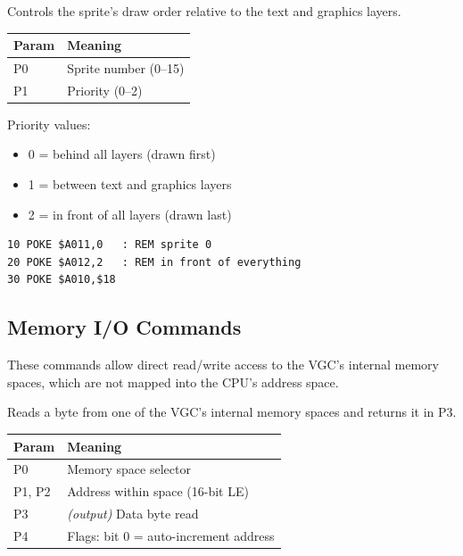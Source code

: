 

Controls the sprite's draw order relative to the text and graphics layers.

\begin{center}
\small
\begin{tabular}{@{}ll@{}}
\toprule
\textbf{Param} & \textbf{Meaning} \\
\midrule
P0 & Sprite number (0--15) \\
P1 & Priority (0--2) \\
\bottomrule
\end{tabular}
\end{center}

Priority values:
\begin{itemize}
  \item 0 = behind all layers (drawn first)
  \item 1 = between text and graphics layers
  \item 2 = in front of all layers (drawn last)
\end{itemize}

\begin{lstlisting}
10 POKE $A011,0   : REM sprite 0
20 POKE $A012,2   : REM in front of everything
30 POKE $A010,$18
\end{lstlisting}


\subsection{Memory I/O Commands}
\label{sec:vgc-mem-cmds}

These commands allow direct read/write access to the VGC's internal memory
spaces, which are not mapped into the CPU's address space.



Reads a byte from one of the VGC's internal memory spaces and returns it in
P3.

\begin{center}
\small
\begin{tabular}{@{}ll@{}}
\toprule
\textbf{Param} & \textbf{Meaning} \\
\midrule
P0     & Memory space selector \\
P1, P2 & Address within space (16-bit LE) \\
P3     & \textit{(output)} Data byte read \\
P4     & Flags: bit 0 = auto-increment address \\
\bottomrule
\end{tabular}
\end{center}


